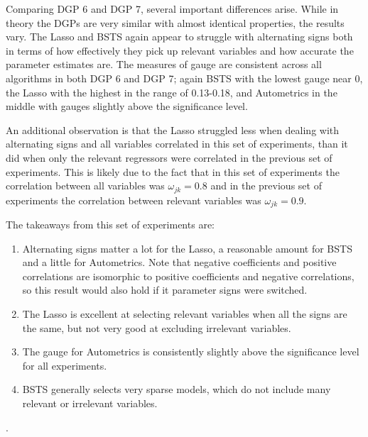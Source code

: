 Comparing DGP 6 and DGP 7, several important differences arise. While in theory the DGPs are very similar with almost identical properties, the results vary. The Lasso and BSTS again appear to struggle with alternating signs both in terms of how effectively they pick up relevant variables and how accurate the parameter estimates are. The measures of gauge are consistent across all algorithms in both DGP 6 and DGP 7; again BSTS with the lowest gauge near 0, the Lasso with the highest in the range of 0.13-0.18, and Autometrics in the middle with gauges slightly above the significance level.

An additional observation is that the Lasso struggled less when dealing with alternating signs and all variables correlated in this set of experiments, than it did when only the relevant regressors were correlated in the previous set of experiments. This is likely due to the fact that in this set of experiments the correlation between all variables was $\omega_{jk} = 0.8$ and in the previous set of experiments the correlation between relevant variables was $\omega_{jk} = 0.9$. 

The takeaways from this set of experiments are:
\begin{enumerate}
\item Alternating signs matter a lot for the Lasso, a reasonable amount for BSTS and a little for Autometrics. Note that negative coefficients and positive correlations are isomorphic to positive coefficients and negative correlations, so this result would also hold if it parameter signs were switched.
\item The Lasso is excellent at selecting relevant variables when all the signs are the same, but not very good at excluding irrelevant variables.
\item The gauge for Autometrics is consistently slightly above the significance level for all experiments. 
\item BSTS generally selects very sparse models, which do not include many relevant or irrelevant variables.
\end{enumerate}.

\clearpage
























